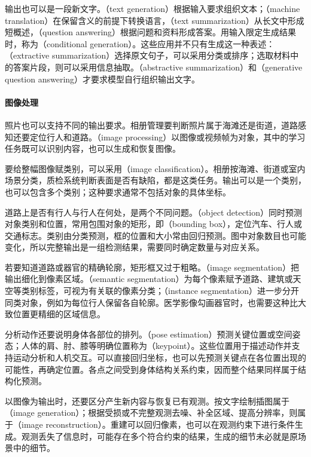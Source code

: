 输出也可以是一段新文字。（text generation）根据输入要求组织文本；（machine translation）在保留含义的前提下转换语言，（text summarization）从长文中形成短概述，（question answering）根据问题和资料形成答案。用输入限定生成结果时，称为（conditional generation）。这些应用并不只有生成这一种表述：（extractive summarization）选择原文句子，可以采用分类或排序；选取材料中的答案片段，则可以采用信息抽取。（abstractive summarization）和（generative question answering）才要求模型自行组织输出文字。

\paragraph{图像处理}
照片也可以支持不同的输出要求。相册管理要判断照片属于海滩还是街道，道路感知还要定位行人和道路。（image processing）以图像或视频帧为对象，其中的学习任务既可以识别内容，也可以生成和恢复图像。

要给整幅图像赋类别，可以采用（image classification）。相册按海滩、街道或室内场景分类，质检系统判断表面是否有缺陷，都是这类任务。输出可以是一个类别，也可以包含多个类别；这种要求通常不包括对象的具体坐标。

道路上是否有行人与行人在何处，是两个不同问题。（object detection）同时预测对象类别和位置，常用包围对象的矩形，即（bounding box），定位汽车、行人或交通标志。类别由分类预测，框的位置和大小常由回归预测。图中对象数目也可能变化，所以完整输出是一组检测结果，需要同时确定数量与对应关系。

若要知道道路或器官的精确轮廓，矩形框又过于粗略。（image segmentation）把输出细化到像素区域。（semantic segmentation）为每个像素赋予道路、建筑或天空等类别标签，可视为有关联的像素分类；（instance segmentation）进一步分开同类对象，例如为每位行人保留各自轮廓。医学影像勾画器官时，也需要这种比大致位置更精细的区域信息。

分析动作还要说明身体各部位的排列。（pose estimation）预测关键位置或空间姿态；人体的肩、肘、膝等明确位置称为（keypoint）。这些位置用于描述动作并支持运动分析和人机交互。可以直接回归坐标，也可以先预测关键点在各位置出现的可能性，再确定位置。各点之间受到身体结构关系约束，因而整个结果同样属于结构化预测。

以图像为输出时，还要区分产生新内容与恢复已有观测。按文字绘制插图属于（image generation）；根据受损或不完整观测去噪、补全区域、提高分辨率，则属于（image reconstruction）。重建可以回归像素，也可以在观测约束下进行条件生成。观测丢失了信息时，可能存在多个符合约束的结果，生成的细节未必就是原场景中的细节。

